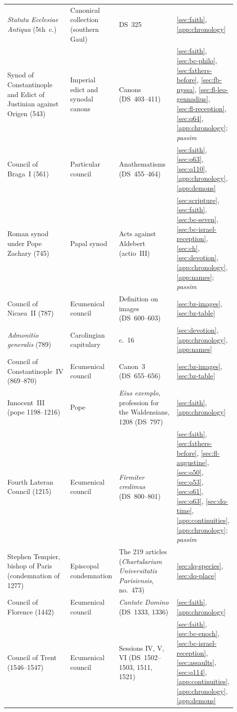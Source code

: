 \begin{longtable}{@{}>{\raggedright\arraybackslash}p{0.21\linewidth}>{\raggedright\arraybackslash}p{0.20\linewidth}>{\raggedright\arraybackslash}p{0.35\linewidth}>{\raggedright\arraybackslash}p{0.17\linewidth}@{}}
\emph{Statuta Ecclesiae Antiqua} (5th~c.) & Canonical collection (southern Gaul) & DS~325 & \ref{sec:faith}, \ref{app:chronology}\\
Synod of Constantinople and Edict of Justinian against Origen (543) & Imperial edict and synodal canons & Canons (DS~403--411) & \ref{sec:faith}, \ref{sec:bc-philo}, \ref{sec:fathers-before}, \ref{sec:fb-nyssa}, \ref{sec:fl-leo-gennadius}, \ref{sec:fl-reception}, \ref{sec:q64}, \ref{app:chronology}; \emph{passim}\\
Council of Braga~I (561) & Particular council & Anathematisms (DS~455--464) & \ref{sec:faith}, \ref{sec:q63}, \ref{sec:q110}, \ref{app:chronology}, \ref{app:demons}\\
Roman synod under Pope Zachary (745) & Papal synod & Acts against Aldebert (actio~III) & \ref{sec:scripture}, \ref{sec:faith}, \ref{sec:bc-seven}, \ref{sec:bc-israel-reception}, \ref{sec:ch}, \ref{sec:devotion}, \ref{app:chronology}, \ref{app:names}; \emph{passim}\\
Council of Nicaea~II (787) & Ecumenical council & Definition on images (DS~600--603) & \ref{sec:bz-images}, \ref{sec:bz-table}\\
\emph{Admonitio generalis} (789) & Carolingian capitulary & c.~16 & \ref{sec:devotion}, \ref{app:chronology}, \ref{app:names}\\
Council of Constantinople~IV (869--870) & Ecumenical council & Canon~3 (DS~655--656) & \ref{sec:bz-images}, \ref{sec:bz-table}\\
Innocent~III (pope 1198--1216) & Pope & \emph{Eius exemplo}, profession for the Waldensians, 1208 (DS~797) & \ref{sec:faith}, \ref{app:chronology}\\
Fourth Lateran Council (1215) & Ecumenical council & \emph{Firmiter credimus} (DS~800--801) & \ref{sec:faith}, \ref{sec:fathers-before}, \ref{sec:fl-augustine}, \ref{sec:q50}, \ref{sec:q53}, \ref{sec:q61}, \ref{sec:q63}, \ref{sec:dq-time}, \ref{app:continuities}, \ref{app:chronology}; \emph{passim}\\
Stephen Tempier, bishop of Paris (condemnation of 1277) & Episcopal condemnation & The 219 articles (\emph{Chartularium Universitatis Parisiensis}, no.~473) & \ref{sec:dq-species}, \ref{sec:dq-place}\\
Council of Florence (1442) & Ecumenical council & \emph{Cantate Domino} (DS~1333, 1336) & \ref{sec:faith}, \ref{app:chronology}\\
Council of Trent (1546--1547) & Ecumenical council & Sessions IV, V, VI (DS~1502--1503, 1511, 1521) & \ref{sec:faith}, \ref{sec:bc-enoch}, \ref{sec:bc-israel-reception}, \ref{sec:assaults}, \ref{sec:q114}, \ref{app:continuities}, \ref{app:chronology}, \ref{app:demons}\\

\end{longtable}
